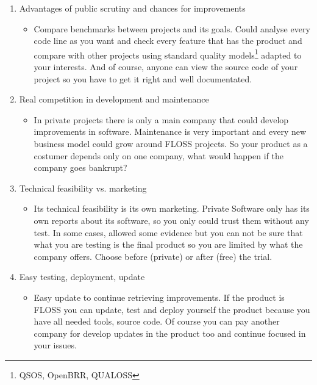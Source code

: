 \begin{enumerate}

    \item Advantages of public scrutiny and chances for improvements
    \begin{itemize}
        \item Compare benchmarks between projects and its goals. Could analyse every code line as you want and check every feature that has the product and compare with other projects using standard quality models\footnote{QSOS, OpenBRR, QUALOSS} adapted to your interests. And of course, anyone can view the source code of your project so you have to get it right and well documentated.
    \end{itemize}

    \item Real competition in development and maintenance
    \begin{itemize}
        \item In private projects there is only a main company that could develop improvements in software. Maintenance is very important and every new business model could grow around FLOSS projects. So your product as a costumer depends only on one company, what would happen if the company goes bankrupt?
    \end{itemize}

    \item Technical feasibility vs. marketing
    \begin{itemize}
        \item Its technical feasibility is its own marketing. Private Software only has its own reports about its software, so you only could trust them without any test. In some cases, allowed some evidence but you can not be sure that what you are testing is the final product so you are limited by what the company offers. Choose before (private) or after (free) the trial.
    \end{itemize}

    \item Easy testing, deployment, update
    \begin{itemize}
        \item Easy update to continue retrieving improvements. If the product is FLOSS you can update, test and deploy yourself the product because you have all needed tools, source code. Of course you can pay another company for develop updates in the product too and continue focused in your issues.
    \end{itemize}


\end{enumerate}
